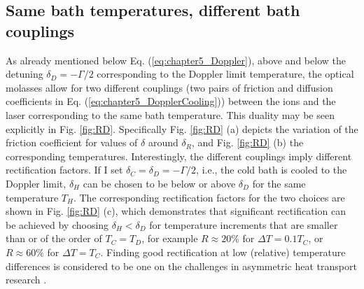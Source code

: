 \subsection{Same bath temperatures, different bath couplings\label{TC}}
%
%
As already mentioned below Eq. (\ref{eq:chapter5_Doppler}), above and below the detuning  $\delta_D=-\Gamma/2$ corresponding to the  Doppler limit temperature, the optical molasses allow for
two different couplings (two pairs of friction and diffusion coefficients in Eq. (\ref{eq:chapter5_DopplerCooling})) between the ions and the laser corresponding to the same bath temperature.
This duality may be seen explicitly in Fig. \ref{fig:RD}. Specifically Fig. \ref{fig:RD} (a) depicts the variation of the friction coefficient for values of $\delta$ around $\delta_R$,  and Fig. \ref{fig:RD} (b) the corresponding temperatures.
Interestingly, the different couplings imply different rectification factors.
If I set $\delta_C = \delta_D=-\Gamma / 2$,  i.e., the cold bath is cooled to the Doppler limit, $\delta_H$ can be chosen to be below or above $\delta_D$ for the same temperature $T_H$. The corresponding rectification factors for the two choices
are shown in  Fig. \ref{fig:RD} (c),
which
demonstrates that significant rectification can be achieved by choosing $\delta_H<\delta_D$ for temperature increments that
are smaller than or of the order of $T_C=T_D$, for example $R\approx 20\%$ for $\Delta T=0.1 T_C$, or $R\approx 60\%$
for $\Delta T= T_C$.  Finding good rectification at low (relative) temperature differences is considered to be one on the challenges
in asymmetric heat transport research \cite{Zhang2015}.

%
%
%
